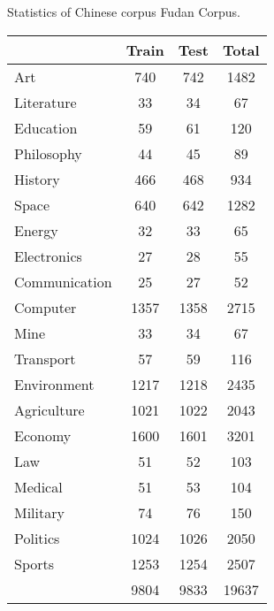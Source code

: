 \centering
\caption{Statistics of Chinese corpus Fudan Corpus.}
\begin{tabular}{|l|c|c|c|}
\hline
                            & Train & Test & Total \\ \hline
Art                         & 740   & 742  & 1482  \\ \hline
Literature                  & 33    & 34   & 67    \\ \hline
Education                   & 59    & 61   & 120   \\ \hline
Philosophy                  & 44    & 45   & 89    \\ \hline
History                     & 466   & 468  & 934   \\ \hline
Space                       & 640   & 642  & 1282  \\ \hline
Energy                      & 32    & 33   & 65    \\ \hline
Electronics                 & 27    & 28   & 55    \\ \hline
Communication               & 25    & 27   & 52    \\ \hline
Computer                    & 1357  & 1358 & 2715  \\ \hline
Mine                        & 33    & 34   & 67    \\ \hline
Transport                   & 57    & 59   & 116   \\ \hline
Environment                 & 1217  & 1218 & 2435  \\ \hline
Agriculture                 & 1021  & 1022 & 2043  \\ \hline
Economy                     & 1600  & 1601 & 3201  \\ \hline
Law                         & 51    & 52   & 103   \\ \hline
Medical                     & 51    & 53   & 104   \\ \hline
Military                    & 74    & 76   & 150   \\ \hline
Politics                    & 1024  & 1026 & 2050  \\ \hline
Sports                      & 1253  & 1254 & 2507  \\ \hline
                            & 9804  & 9833 & 19637 \\ \hline
\end{tabular}

